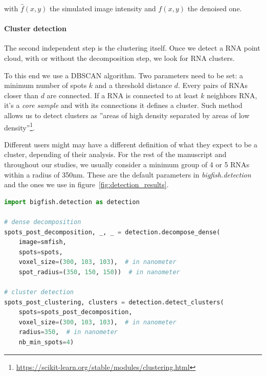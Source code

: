 \noindent
with $\hat{f}(x, y)$ the simulated image intensity and $f(x, y)$ the denoised one.

\paragraph{Cluster detection}

The second independent step is the clustering itself.
Once we detect a \ac{RNA} point cloud, with or without the decomposition step, we look for \ac{RNA} clusters.

To this end we use a DBSCAN algorithm\cite{ester_density-based_1996, scikit-learn}.
Two parameters need to be set: a minimum number of spots $k$ and a threshold distance $d$.
Every pairs of \ac{RNA}s closer than $d$ are connected.
If a \ac{RNA} is connected to at least $k$ neighbors \ac{RNA}, it's a \emph{core sample} and with its connections it defines a cluster.
Such method allows us to detect clusters as ''areas of high density separated by areas of low density''\footnote{\url{https://scikit-learn.org/stable/modules/clustering.html}}.

Different users might may have a different definition of what they expect to be a cluster, depending of their analysis.
For the rest of the manuscript and throughout our studies, we usually consider a minimum group of 4 or 5 \ac{RNA}s within a radius of 350nm.
These are the default parameters in \emph{bigfish.detection} and the ones we use in figure~\ref{fig:detection_results}.\\

\begin{minipage}{0.9\textwidth}
\begin{lstlisting}[language=Python]
import bigfish.detection as detection

# dense decomposition
spots_post_decomposition, _, _ = detection.decompose_dense(
    image=smfish,
    spots=spots,
    voxel_size=(300, 103, 103),  # in nanometer
    spot_radius=(350, 150, 150))  # in nanometer

# cluster detection
spots_post_clustering, clusters = detection.detect_clusters(
    spots=spots_post_decomposition,
    voxel_size=(300, 103, 103),  # in nanometer
    radius=350,  # in nanometer
    nb_min_spots=4)
\end{lstlisting}
\end{minipage}

